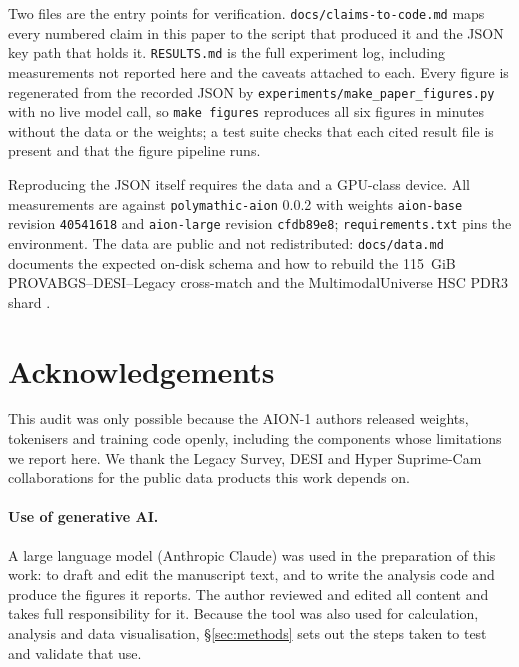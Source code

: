 \documentclass[11pt]{article}
\newcommand{\aion}{AION-1}
\begin{document}
Two files are the entry points for verification. \texttt{docs/claims-to-code.md} maps every
numbered claim in this paper to the script that produced it and the JSON key path that holds it.
\texttt{RESULTS.md} is the full experiment log, including measurements not reported here and the
caveats attached to each. Every figure is regenerated from the recorded JSON by
\texttt{experiments/make\_paper\_figures.py} with no live model call, so \texttt{make figures}
reproduces all six figures in minutes without the data or the weights; a test suite checks that
each cited result file is present and that the figure pipeline runs.

Reproducing the JSON itself requires the data and a GPU-class device. All measurements are
against \texttt{polymathic-aion} 0.0.2 with weights \texttt{aion-base} revision
\texttt{40541618} and \texttt{aion-large} revision \texttt{cfdb89e8}; \texttt{requirements.txt}
pins the environment. The data are public and not redistributed: \texttt{docs/data.md} documents
the expected on-disk schema and how to rebuild the \SI{115}{GiB} PROVABGS--DESI--Legacy
cross-match \citep{hahn2023provabgs,dey2019legacy,desi2024edr} and the MultimodalUniverse HSC
PDR3 shard \citep{mmu2024multimodal,aihara2022hscpdr3}.

\section*{Acknowledgements}

This audit was only possible because the \aion{} authors released weights, tokenisers and
training code openly, including the components whose limitations we report here. We thank the
Legacy Survey, DESI and Hyper Suprime-Cam collaborations for the public data products this work
depends on.

\paragraph{Use of generative AI.} A large language model (Anthropic Claude) was used in the
preparation of this work: to draft and edit the manuscript text, and to write the analysis code
and produce the figures it reports. The author reviewed and edited all content and takes full
responsibility for it. Because the tool was also used for calculation, analysis and data
visualisation, \S\ref{sec:methods} sets out the steps taken to test and validate that use.


\end{document}
